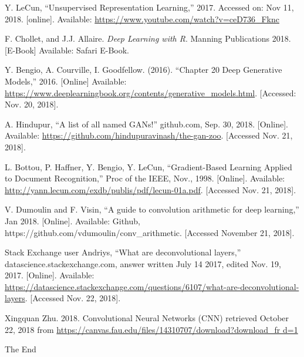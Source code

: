 \documentclass{beamer}
\begin{document}
\begin{frame}[allowframebreaks]
{\begin{thebibliography}{99}
 Y. LeCun, ``Unsupervised Representation Learning,''
2017. Accessed on: Nov 11, 2018. [online]. Available: \url{https://www.youtube.com/watch?v=ceD736_Fknc}  

 F. Chollet, and J.J. Allaire.  
\textit{Deep Learning with R}. Manning Publications 2018. [E-Book] Available: Safari
E-Book.

 Y. Bengio, A. Courville, I. Goodfellow. (2016).
``Chapter 20 Deep Generative Models,'' 2016. [Online] Available:
\url{https://www.deeplearningbook.org/contents/generative\_models.html}.
[Accessed: Nov. 20, 2018].

 A. Hindupur, ``A list of all named GANs!'' github.com, Sep. 30,
2018. [Online]. Available: \url{https://github.com/hindupuravinash/the-gan-zoo}. 
[Accessed Nov. 21, 2018]. 

 L. Bottou, P. Haffner, Y. Bengio, Y. LeCun, ``Gradient-Based Learning
Applied to Document Recognition,'' Proc of the IEEE, Nov., 1998. [Online]. Available:
\url{http://yann.lecun.com/exdb/publis/pdf/lecun-01a.pdf}. [Accessed Nov. 21, 2018].

 V. Dumoulin and F. Visin, ``A guide to convolution arithmetic for 
deep learning,'' Jan 2018. [Online]. Available: Github, https://github.com/vdumoulin/conv\_arithmetic.  [Accessed November 21, 2018].

 Stack Exchange user Andriys, ``What are deconvolutional layers,''
datascience.stackexchange.com, answer written July 14 2017, edited Nov. 19, 2017. 
[Online]. Available: 
\url{https://datascience.stackexchange.com/questions/6107/what-are-deconvolutional-layers}. 
[Accessed Nov.  22, 2018].

 Xingquan Zhu. 2018. Convolutional Neural Networks (CNN) retrieved
 October 22, 2018 from \url{https://canvas.fau.edu/files/14310707/download?download\_fr
d=1}

\end{thebibliography}
}
\end{frame}


\begin{frame}
\Huge{\centerline{The End}}
\end{frame}

\end{document}

